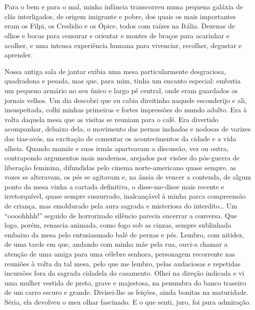 \chapter{}
Para o bem e para o mal, minha infância transcorreu numa pequena galáxia de clãs interligados, de origem imigrante e pobre, dos quais os mais importantes eram os Filpi, os Credidio e os Ópice, todos com raízes na Itália. 
Dezenas de olhos e bocas para censurar e orientar e montes de braços para acarinhar e acolher, e uma intensa experiência humana para vivenciar, recolher, degustar e aprender. 

Nossa antiga sala de jantar exibia uma mesa particularmente desgraciosa, quadradona e pesada, mas que, para mim, tinha um encanto especial: embutia um pequeno armário no seu único e largo pé central, onde eram guardados os jornais velhos. 
Um dia descobri que eu cabia direitinho naquele esconderijo e ali, insuspeitada, colhi minhas primeiras e fortes impressões do mundo adulto.  
Era à volta daquela mesa que as visitas se reuniam para o café. 
Era divertido acompanhar, debaixo dela, o movimento das pernas inchadas e nodosas de varizes das tias-avós, na excitação de comentar os acontecimentos da cidade e a vida alheia. 
Quando mamãe e suas irmãs aparteavam a discussão, vez ou outra, contrapondo argumentos mais modernos, arejados por visões do pós-guerra de liberação feminina, difundidas pelo cinema norte-americano quase sempre, as vozes se alteravam, os pés se agitavam e, na ânsia de vencer a contenda, de algum ponto da mesa vinha a cartada definitiva, o disse-me-disse mais recente e irretorquível, quase sempre sussurrado, inalcançável à minha parca compreensão de criança, mas emoldurado pela aura sagrada e misteriosa do interdito\dots 
Um “oooohhhh!” seguido de horrorizado silêncio parecia encerrar a conversa. 
Que logo, porém, renascia animada, como fogo sob as cinzas, sempre sublinhada embaixo da mesa pelo entusiasmado balé de pernas e pés. 
Lembro, com nitidez, de uma tarde em que, andando com minha mãe pela rua, ouvi-a chamar a atenção de uma amiga para uma célebre senhora, personagem recorrente nas reuniões à volta da tal mesa, pelo que me lembro, pelas audaciosas e repetidas incursões fora da sagrada cidadela do casamento. 
Olhei na direção indicada e vi uma mulher vestida de preto, grave e majestosa, na penumbra do banco traseiro de um carro escuro e grande.
Divisei-lhe as feições, ainda bonitas na maturidade. 
Séria, ela devolveu o meu olhar fascinado. E o que senti, juro, foi pura admiração.

